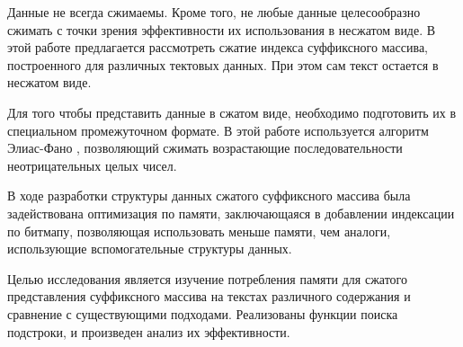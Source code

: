 Данные не всегда сжимаемы. Кроме того, не любые данные целесообразно сжимать с точки зрения эффективности
их использования в несжатом виде. В этой работе предлагается рассмотреть сжатие индекса суффиксного массива,
построенного для различных тектовых данных. При этом сам текст остается в несжатом виде.

Для того чтобы представить данные в сжатом виде, необходимо подготовить их
в специальном промежуточном формате. В этой работе используется алгоритм Элиас-Фано \cite{pibiri2014dynamic},
позволяющий сжимать возрастающие последовательности неотрицательных целых чисел.

В ходе разработки структуры данных сжатого суффиксного массива была задействована оптимизация
по памяти, заключающаяся в добавлении индексации по битмапу, позволяющая использовать меньше памяти,
чем аналоги, использующие вспомогательные структуры данных.

Целью исследования является изучение потребления памяти для сжатого представления суффиксного массива
на текстах различного содержания и сравнение с существующими подходами.
Реализованы функции поиска подстроки, и произведен анализ их эффективности.

